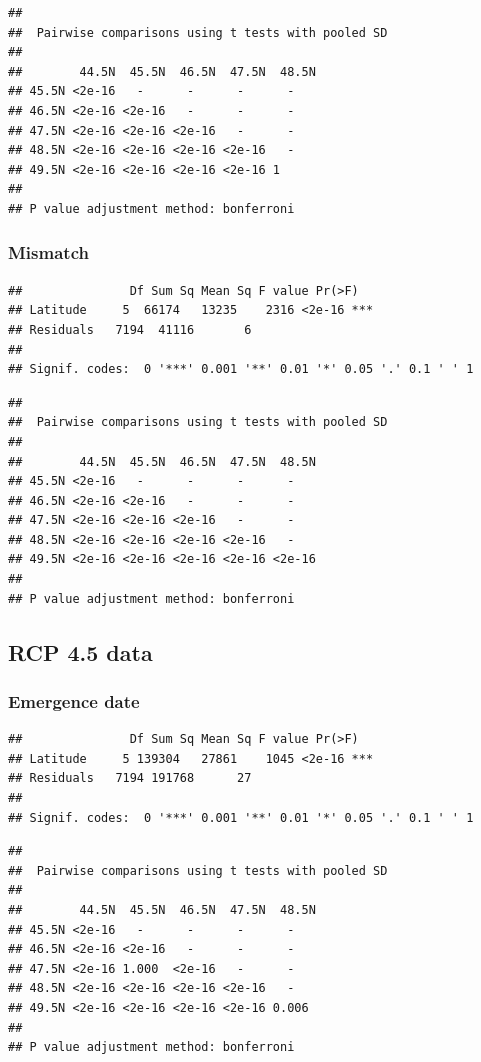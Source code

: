 \documentclass[12 pt]{article}
\begin{document}
\begin{verbatim}
## 
##  Pairwise comparisons using t tests with pooled SD 
## 
##        44.5N  45.5N  46.5N  47.5N  48.5N
## 45.5N <2e-16   -      -      -      -    
## 46.5N <2e-16 <2e-16   -      -      -    
## 47.5N <2e-16 <2e-16 <2e-16   -      -    
## 48.5N <2e-16 <2e-16 <2e-16 <2e-16   -    
## 49.5N <2e-16 <2e-16 <2e-16 <2e-16 1    
## 
## P value adjustment method: bonferroni
\end{verbatim}

\subsubsection*{Mismatch}

\begin{verbatim}
##               Df Sum Sq Mean Sq F value Pr(>F)    
## Latitude     5  66174   13235    2316 <2e-16 ***
## Residuals   7194  41116       6                   
## 
## Signif. codes:  0 '***' 0.001 '**' 0.01 '*' 0.05 '.' 0.1 ' ' 1
\end{verbatim}

\begin{verbatim}
## 
##  Pairwise comparisons using t tests with pooled SD 
##  
##        44.5N  45.5N  46.5N  47.5N  48.5N
## 45.5N <2e-16   -      -      -      -     
## 46.5N <2e-16 <2e-16   -      -      -     
## 47.5N <2e-16 <2e-16 <2e-16   -      -     
## 48.5N <2e-16 <2e-16 <2e-16 <2e-16   -     
## 49.5N <2e-16 <2e-16 <2e-16 <2e-16 <2e-16
## 
## P value adjustment method: bonferroni
\end{verbatim}

\subsection{RCP 4.5 data}
\subsubsection*{Emergence date}

\begin{verbatim}
##               Df Sum Sq Mean Sq F value Pr(>F)    
## Latitude     5 139304   27861    1045 <2e-16 ***
## Residuals   7194 191768      27                   
## 
## Signif. codes:  0 '***' 0.001 '**' 0.01 '*' 0.05 '.' 0.1 ' ' 1
\end{verbatim}

\begin{verbatim}
## 
##  Pairwise comparisons using t tests with pooled SD 
##  
##        44.5N  45.5N  46.5N  47.5N  48.5N
## 45.5N <2e-16   -      -      -      -    
## 46.5N <2e-16 <2e-16   -      -      -    
## 47.5N <2e-16 1.000  <2e-16   -      -    
## 48.5N <2e-16 <2e-16 <2e-16 <2e-16   -    
## 49.5N <2e-16 <2e-16 <2e-16 <2e-16 0.006
## 
## P value adjustment method: bonferroni
\end{verbatim}
\end{document}
